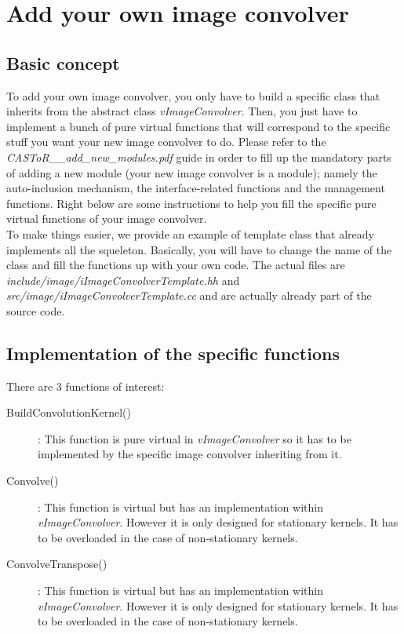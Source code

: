 \documentclass[a4paper, 11pt]{article}
\begin{document}
\section{Add your own image convolver}

\subsection{Basic concept}

To add your own image convolver, you only have to build a specific class that inherits from the abstract class \textit{vImageConvolver}. Then, you just have to implement
a bunch of pure virtual functions that will correspond to the specific stuff you want your new image convolver to do. Please refer to the
\textit{CASToR\_\_add\_new\_modules.pdf} guide in order to fill up the mandatory parts of adding a new module (your new image convolver is a module); namely
the auto-inclusion mechanism, the interface-related functions and the management functions. Right below are some instructions to help you fill the specific
pure virtual functions of your image convolver.\\

To make things easier, we provide an example of template class that already implements all the squeleton. Basically, you will have to change the name of the class
and fill the functions up with your own code. The actual files are \textit{include/image/iImageConvolverTemplate.hh} and \textit{src/image/iImageConvolverTemplate.cc}
and are actually already part of the source code.

\subsection{Implementation of the specific functions}

There are 3 functions of interest:

\begin{description}
  \item [BuildConvolutionKernel()]: This function is pure virtual in \textit{vImageConvolver} so it has to be implemented by the specific image convolver inheriting from it.
  \item [Convolve()]: This function is virtual but has an implementation within \textit{vImageConvolver}. However it is only designed for stationary kernels. It has to be
                      overloaded in the case of non-stationary kernels.
  \item [ConvolveTranspose()]: This function is virtual but has an implementation within \textit{vImageConvolver}. However it is only designed for stationary kernels. It has
                               to be overloaded in the case of non-stationary kernels.
\end{description}
\end{document}
